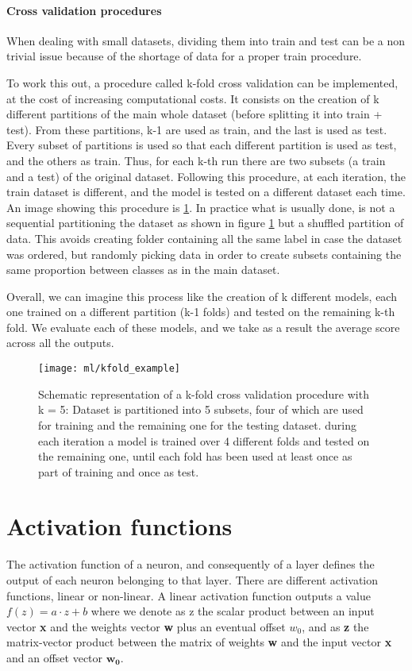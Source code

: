 \documentclass[11pt]{report}
\begin{document}
\paragraph{Cross validation procedures} \hfill

\noindent When dealing with small datasets, dividing them into train and test can be a non trivial issue because of the shortage of data for a proper train procedure.

To work this out, a procedure called k-fold cross validation can be implemented, at the cost of increasing computational costs.
It consists on the creation of k different partitions of the main whole dataset (before splitting it into train + test).
From these partitions, k-1 are used as train, and the last is used as test.
Every subset of partitions is used so that each different partition is used as test, and the others as train.
Thus, for each k-th run there are two subsets (a train and a test) of the original dataset.
Following this procedure, at each iteration, the train dataset is different, and the model is tested on a different dataset each time.
An image showing this procedure is \ref{fig:kfold}.
In practice what is usually done, is not a sequential partitioning the dataset as shown in figure \ref{fig:kfold} but a shuffled partition of data.
This avoids creating folder containing all the same label in case the dataset was ordered, but randomly picking data in order to create subsets containing the same proportion between classes as in the main dataset.

Overall, we can imagine this process like the creation of k different models, each one trained on a different partition (k-1 folds) and tested on the remaining k-th fold.
We evaluate each of these models, and we take as a result the average score across all the outputs.


\begin{figure}
\centering
\texttt{[image: ml/kfold\_example]}
\caption{Schematic representation of a k-fold cross validation procedure with k = 5: Dataset is partitioned into 5 subsets, four of which are used for training and the remaining one for the testing dataset. during each iteration a model is trained over 4 different folds and tested on the remaining one, until each fold has been used at least once as part of training and once as test.
}
\label{fig:kfold}
\end{figure}


\section{Activation functions}\label{sec:activation_functions}
The activation function of a neuron, and consequently of a layer defines the output of each neuron belonging to that layer.
There are different activation functions, linear or non-linear.
A linear activation function outputs a value $f(z) = a \cdot z + b$ where we denote as z the scalar product between an input vector \textbf{x} and the weights vector \textbf{w} plus an eventual offset $w_0$, and as \textbf{z} the matrix-vector product between the matrix of weights \textbf{w} and the input vector \textbf{x} and an offset vector $\mathbf{w_0}$.
\end{document}
